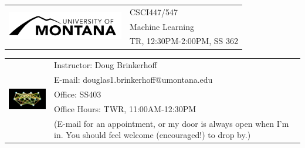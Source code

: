 \documentclass[11pt]{article}
\begin{document}
\begin{tabular}{ l l }
  \multirow{3}{*}{\includegraphics[width=2in]{Main-Logo-black.png}} & \LARGE CSCI447/547 \\
  & \LARGE Machine Learning \\
  & \LARGE TR, 12:30PM-2:00PM, SS 362\\
\end{tabular}
\vspace{7mm}

\begin{tabular}{ l l }
  \multirow{6}{*}{\includegraphics[height=1in]{nn.png}} & \large Instructor: Doug Brinkerhoff \\
  & \large E-mail: douglas1.brinkerhoff@umontana.edu \\
  & \large Office: SS403 \\
  & \large Office Hours: TWR, 11:00AM-12:30PM \\
	& (E-mail for an appointment, or my door is always open when I'm in.  You should feel welcome (encouraged!) to drop by.)\\
\end{tabular}
\vspace{5mm}
\end{document}
